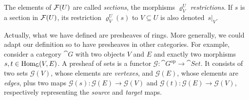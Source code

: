 \begin{ntn}
    The elements of\/ $\mathcal{F}(U)$ are called \textsl{sections}, the morphisms\/ $\varrho^U_V$ \textsl{restrictions}. If\/ $s$ is a section in\/ $\mathcal{F}(U)$, its restriction\/ $\varrho^U_V(s)$ to\/ $V\subseteq U$ is also denoted\/~$s|_V$.
\end{ntn}

\begin{rem}
    Actually, what we have defined are presheaves of rings. More generally, we could adapt our definition so to have presheaves in other categories. For example, consider a category $\cat G$ with two objects $V$ and $E$ and exactly two morphisms $s,t\in{\rm Hom}_{\mathsf{G}}(V,E)$. A presheaf of sets is a functor $\mathcal G\colon\cat G^{\text{op}}\to\cat{Set}$. It consists of two sets $\mathcal G(V)$, whose elements are \textsl{vertexes}, and $\mathcal G(E)$, whose elements are \textsl{edges}, plus two maps $\mathcal G(s)\colon\mathcal G(E)\to\mathcal G(V)$ and $\mathcal G(t)\colon\mathcal G(E)\to\mathcal G(V)$, respectively representing the \textsl{source} and \textsl{target} maps. 
\end{rem}

